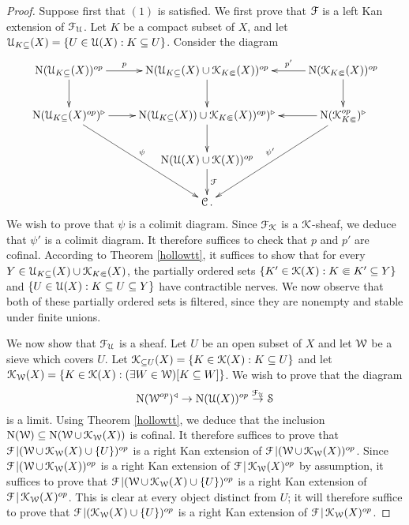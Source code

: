 \begin{proof}
Suppose first that $(1)$ is satisfied. We first prove that $\operatorname{\mathcal{F}}$ is a left Kan extension of $\operatorname{\mathcal{F}}_{\operatorname{\mathcal{U}}}$. Let $K$ be a compact subset of $X$, and let $\operatorname{\mathcal{U}}_{K \subseteq}(X) = \{ U \in \operatorname{\mathcal{U}}(X): K \subseteq U \}$. Consider the diagram
$$ \xymatrix{ \Nerve(\calU_{K \subseteq}(X))^{op} \ar[r]^-{p} \ar[d] & \Nerve (\calU_{K \subseteq}(X) \cup \calK_{K \Subset}(X))^{op} \ar[d] & \Nerve(\calK_{K \Subset}(X))^{op} \ar[d] \ar[l]_-{p'} \\
\Nerve(\calU_{K \subseteq}(X)^{op})^{\triangleright} \ar[r] \ar[ddr]^{\psi} & 
\Nerve (\calU_{K \subseteq}(X)) \cup \calK_{K \Subset}(X))^{op})^{\triangleright} \ar[d] & \Nerve (\calK_{K \Subset}^{op})^{\triangleright} \ar[ddl]_{\psi'} \ar[l] \\
& \Nerve (\calU(X) \cup \calK(X))^{op} \ar[d]^{\calF} & \\
& \calC. & }$$
We wish to prove that $\psi$ is a colimit diagram. Since $\operatorname{\mathcal{F}}_{\operatorname{\mathcal{K}}}$ is a $\operatorname{\mathcal{K}}$-sheaf, we deduce that $\psi'$ is a colimit diagram. It therefore suffices to check that $p$ and $p'$ are cofinal. 
According to Theorem \ref{hollowtt}, it suffices to show that for every $Y \in \operatorname{\mathcal{U}}_{K \subseteq}(X) \cup \operatorname{\mathcal{K}}_{K \Subset}(X)$, the partially ordered sets $\{ K' \in \operatorname{\mathcal{K}}(X): K \Subset K' \subseteq Y \}$ and $\{ U \in \operatorname{\mathcal{U}}(X): K \subseteq U \subseteq Y \}$ have contractible nerves. We now observe that both of these partially ordered sets is filtered, since they are nonempty and stable under finite unions.

We now show that $\operatorname{\mathcal{F}}_{\operatorname{\mathcal{U}}}$ is a sheaf. Let $U$ be an open subset of $X$ and let $\operatorname{\mathcal{W}}$ be a sieve which covers $U$. Let $\operatorname{\mathcal{K}}_{\subseteq U}(X) = \{ K \in \operatorname{\mathcal{K}}(X): K \subseteq U \}$ and let
$\operatorname{\mathcal{K}}_{\operatorname{\mathcal{W}}}(X) = \{ K \in \operatorname{\mathcal{K}}(X): (\exists W \in \operatorname{\mathcal{W}}) [ K \subseteq W ] \}$. 
We wish to prove that the diagram 
$$ \operatorname{N}(\operatorname{\mathcal{W}}^{op})^{\triangleleft} \rightarrow \operatorname{N}(\operatorname{\mathcal{U}}(X))^{op} \stackrel{\operatorname{\mathcal{F}}_{\operatorname{\mathcal{U}}}} \rightarrow \operatorname{\mathcal{S}}$$ is a limit. Using Theorem \ref{hollowtt}, we deduce that the inclusion
$\operatorname{N}(\operatorname{\mathcal{W}}) \subseteq \operatorname{N} (\operatorname{\mathcal{W}} \cup \operatorname{\mathcal{K}}_{\operatorname{\mathcal{W}}}(X) )$ is cofinal. It therefore suffices to prove that $ \operatorname{\mathcal{F}} | (\operatorname{\mathcal{W}} \cup \operatorname{\mathcal{K}}_{\operatorname{\mathcal{W}}}(X) \cup \{U \})^{op}$ is a right Kan extension of
$\operatorname{\mathcal{F}} | (\operatorname{\mathcal{W}} \cup \operatorname{\mathcal{K}}_{\operatorname{\mathcal{W}}}(X))^{op}$. Since $\operatorname{\mathcal{F}}|(\operatorname{\mathcal{W}} \cup \operatorname{\mathcal{K}}_{\operatorname{\mathcal{W}}}(X))^{op}$ is a right Kan extension of $\operatorname{\mathcal{F}}|\operatorname{\mathcal{K}}_{\operatorname{\mathcal{W}}}(X)^{op}$ by assumption, it suffices to prove that $\operatorname{\mathcal{F}}| (\operatorname{\mathcal{W}} \cup \operatorname{\mathcal{K}}_{\operatorname{\mathcal{W}}}(X) \cup \{U\})^{op}$ is a right Kan extension of $\operatorname{\mathcal{F}}| \operatorname{\mathcal{K}}_{\operatorname{\mathcal{W}}}(X)^{op}$. This is clear at every object distinct from $U$; it will therefore suffice
to prove that $\operatorname{\mathcal{F}}| (\operatorname{\mathcal{K}}_{\operatorname{\mathcal{W}}}(X) \cup \{U\})^{op}$ is a right Kan extension of
$\operatorname{\mathcal{F}}| \operatorname{\mathcal{K}}_{\operatorname{\mathcal{W}}}(X)^{op}$.


\end{proof}
